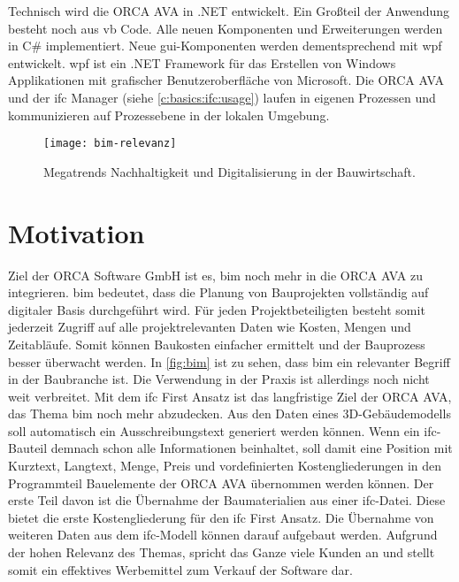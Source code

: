 Technisch wird die ORCA AVA in .NET entwickelt. Ein Großteil der Anwendung besteht noch aus \ac{vb} Code. Alle neuen Komponenten und Erweiterungen werden in C\# implementiert. Neue \ac{gui}-Komponenten werden dementsprechend mit \ac{wpf} entwickelt. \ac{wpf} ist ein .NET Framework für das Erstellen von Windows Applikationen mit grafischer Benutzeroberfläche von Microsoft. \citep[vgl.][]{Microsoft_2022} Die ORCA AVA und der \ac{ifc} Manager (siehe \autoref{c:basics:ifc:usage}) laufen in eigenen Prozessen und kommunizieren auf Prozessebene in der lokalen Umgebung. 

\begin{figure}[h]
	\centering
	\texttt{[image: bim-relevanz]}
	\caption{Megatrends Nachhaltigkeit und Digitalisierung in der Bauwirtschaft.}
	\label{fig:bim}
\end{figure}

\section{Motivation}
\label{c:intro:motivation}

Ziel der \glqq ORCA Software GmbH\grqq{} ist es, \ac{bim} noch mehr in die ORCA AVA zu integrieren. \ac{bim} bedeutet, dass die Planung von Bauprojekten vollständig auf digitaler Basis durchgeführt wird.  Für jeden Projektbeteiligten besteht somit jederzeit Zugriff auf alle projektrelevanten Daten wie Kosten, Mengen und Zeitabläufe. Somit können Baukosten einfacher ermittelt und der Bauprozess besser überwacht werden. In \autoref{fig:bim} ist zu sehen, dass \ac{bim} ein relevanter Begriff in der Baubranche ist. Die Verwendung in der Praxis ist allerdings noch nicht weit verbreitet. \citep[vgl.][p.~20]{RolandBerger2016} Mit dem \glqq \ac{ifc} First\grqq{} Ansatz ist das langfristige Ziel der ORCA AVA, das Thema \ac{bim} noch mehr abzudecken. Aus den Daten eines 3D-Gebäudemodells soll automatisch ein Ausschreibungstext generiert werden können. Wenn ein \ac{ifc}-Bauteil demnach schon alle Informationen beinhaltet, soll damit eine Position mit Kurztext, Langtext, Menge, Preis und vordefinierten Kostengliederungen in den Programmteil Bauelemente der ORCA AVA übernommen werden können. Der erste Teil davon ist die Übernahme der Baumaterialien aus einer \ac{ifc}-Datei. Diese bietet die erste Kostengliederung für den \glqq \ac{ifc} First\grqq{} Ansatz. Die Übernahme von weiteren Daten aus dem \ac{ifc}-Modell können darauf aufgebaut werden. Aufgrund der hohen Relevanz des Themas, spricht das Ganze viele Kunden an und stellt somit ein effektives Werbemittel zum Verkauf der Software dar. 

